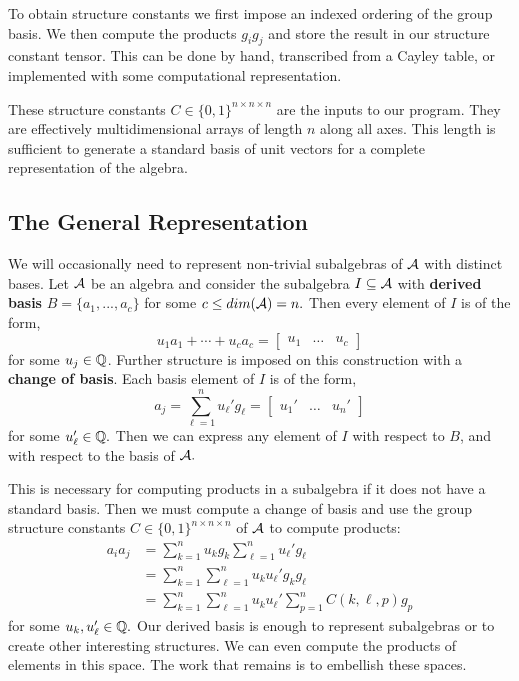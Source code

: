 \documentclass[../thesis.tex]{subfiles}
\begin{document}
To obtain structure constants we first impose an indexed ordering of the group basis. We then compute the products $g_ig_j$ and store the result in our structure constant tensor. This can be done by hand, transcribed from a Cayley table, or implemented with some computational representation.

These structure constants $C\in\{0,1\}^{n\times n\times n}$ are the inputs to our program. They are effectively multidimensional arrays of length $n$ along all axes. This length is sufficient to generate a standard basis of unit vectors for a complete representation of the algebra. 

\subsection{The General Representation}\label{sec:TheGeneralRepresentation}
We will occasionally need to represent non-trivial subalgebras of $\mathcal{A}$ with distinct bases. Let $\mathcal{A}$ be an algebra and consider the subalgebra $I\subseteq\mathcal{A}$ with \textbf{derived basis} $B=\{a_1,...,a_c\}$ for some $c\leq dim(\mathcal{A})=n.$ Then every element of $I$ is of the form,
\begin{equation*}
    u_1a_1 + \cdots + u_ca_c = \begin{bmatrix}u_1&\hdots&u_c\end{bmatrix}    
\end{equation*}
for some $u_j\in\mathbb{Q}$. Further structure is imposed on this construction with a \textbf{change of basis}. Each basis element of $I$ is of the form,
\begin{equation*}
    a_j = \sum_{\ell=1}^n u_{\ell}'g_{\ell} = \begin{bmatrix}u_1'&\hdots&u_n'\end{bmatrix}
\end{equation*}
for some $u_{\ell}'\in\mathbb{Q}.$ Then we can express any element of $I$ with respect to $B$, and with respect to the basis of $\mathcal{A}.$ 

This is necessary for computing products in a subalgebra if it does not have a standard basis. Then we must compute a change of basis and use the group structure constants $C\in\{0,1\}^{n\times n\times n}$ of $\mathcal{A}$ to compute products:
\begin{align*}
    a_ia_j &= \sum_{k=1}^n u_{k}g_k \sum_{\ell=1}^n u_{\ell}'g_{\ell}\\
    &= \sum_{k=1}^n\sum_{\ell=1}^n u_{k}u_{\ell}'g_kg_{\ell}\\
    &= \sum_{k=1}^n\sum_{\ell=1}^n u_{k}u_{\ell}'\sum_{p=1}^nC(k,\ell,p)g_p
\end{align*}
for some $u_{k},u_{\ell}'\in\mathbb{Q}.$ Our derived basis is enough to represent subalgebras or to create other interesting structures. We can even compute the products of elements in this space. The work that remains is to embellish these spaces.
\end{document}
